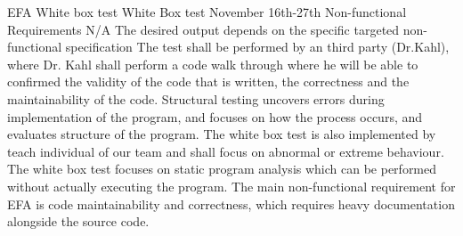 \documentclass[12pt]{report}
\begin{document}
{EFA White box test} 
{White Box test}  
{November 16th-27th}
{Non-functional Requirements}
{N/A}
{The desired output depends on the specific targeted non-functional specification}
{The test shall be performed by an third party (Dr.Kahl), where Dr. Kahl shall perform a code walk through where he will be able to confirmed the validity of the code that is written, the correctness and the maintainability of the code. Structural testing uncovers errors during implementation of the program, and focuses on how the process occurs, and evaluates structure of the program. The white box test is also implemented by teach individual of our team and shall focus on abnormal or extreme behaviour. The white box test focuses on static program analysis which can be performed without actually executing the program. The main non-functional requirement for EFA is code maintainability and correctness, which requires heavy documentation alongside the source code. }
\end{document}
